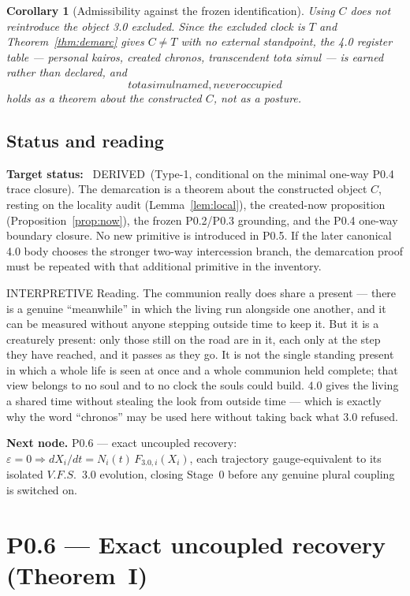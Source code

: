 \documentclass[11pt,a4paper]{article}
\def\mathrm#1{#1}%
\def\textit#1{#1}%
\def\emph#1{#1}%
\newcommand{\VFS}{\ensuremath{\mathrm{V.F.S.}}}
\newcommand{\stDerived}{\textcolor{cDer}{\textsf{\small DERIVED}}}
\newcommand{\stInterp}{\textcolor{cInt}{\textsf{\small INTERPRETIVE}}}
\theoremstyle{definition}
\theoremstyle{plain}
\newtheorem{corollary}[definition]{Corollary}
\theoremstyle{remark}
\begin{document}
\begin{corollary}[Admissibility against the frozen identification]\label{cor:adm}
Using \(C\) does not reintroduce the object 3.0 excluded. Since the excluded clock is
\(T\) and Theorem~\ref{thm:demarc} gives \(C\neq T\) with no external standpoint, the
4.0 register table --- personal kairos, created chronos, transcendent \textit{tota
simul} --- is earned rather than declared, and
\[
\textit{tota simul named, never occupied}
\]
holds as a theorem about the constructed \(C\), not as a posture.
\end{corollary}

\subsection{Status and reading}

\textbf{Target status:}~
\stDerived\ (Type-1, conditional on the minimal one-way P0.4 trace closure). The
demarcation is a theorem about the constructed object \(C\), resting on the locality
audit (Lemma~\ref{lem:local}), the created-now proposition (Proposition~\ref{prop:now}),
the frozen P0.2/P0.3 grounding, and the P0.4 one-way boundary closure. No new primitive
is introduced in P0.5. If the later canonical 4.0 body chooses the stronger two-way
intercession branch, the demarcation proof must be repeated with that additional
primitive in the inventory.

\medskip
\stInterp\quad
\emph{Reading.}
The communion really does share a present --- there is a genuine ``meanwhile'' in which
the living run alongside one another, and it can be measured without anyone stepping
outside time to keep it. But it is a creaturely present: only those still on the road are
in it, each only at the step they have reached, and it passes as they go. It is not the
single standing present in which a whole life is seen at once and a whole communion held
complete; that view belongs to no soul and to no clock the souls could build. 4.0 gives
the living a shared time without stealing the look from outside time --- which is exactly
why the word ``chronos'' may be used here without taking back what 3.0 refused.

\medskip
\textbf{Next node.} P0.6 --- exact uncoupled recovery: \(\varepsilon=0\Rightarrow
dX_i/dt=N_i(t)\,F_{3.0,i}(X_i)\), each trajectory gauge-equivalent to its isolated
\VFS\ 3.0 evolution, closing Stage~0 before any genuine plural coupling is switched on.

\section{P0.6 --- Exact uncoupled recovery (Theorem~I)}
\end{document}
